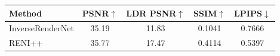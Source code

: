 \begin{tabular}{l|cccc}
\hline
Method & PSNR$\uparrow$ & LDR PSNR$\uparrow$ & SSIM$\uparrow$ & LPIPS$\downarrow$ \\
\hline
InverseRenderNet & 35.19 & 11.83 & 0.1041 & 0.7666 \\
RENI++ & 35.77 & 17.47 & 0.4114 & 0.5397 \\
\hline
\end{tabular}